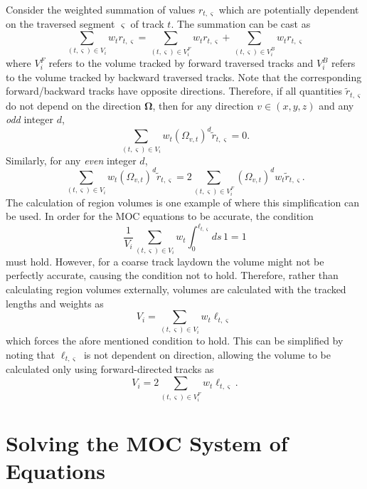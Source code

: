 Consider the weighted summation of values $r_{t,\varsigma}$ which are potentially dependent on the traversed segment $\varsigma$ of track $t$. The summation can be cast as
\begin{equation}
	\sum_{(t,\varsigma) \in V_i} w_t r_{t,\varsigma} = \sum_{(t,\varsigma) \in V^F_i} w_t r_{t,\varsigma} + \sum_{(t,\varsigma) \in V^B_i} w_t r_{t,\varsigma}
\end{equation}
where $V^F_i$ refers to the volume tracked by forward traversed tracks and $V^B_i$ refers to the volume tracked by backward traversed tracks. Note that the corresponding forward/backward tracks have opposite directions. Therefore, if all quantities $\tilde{r}_{t,\varsigma}$ do not depend on the direction $\mathbf{\Omega}$, then for any direction $v \in (x,y,z)$ and any \textit{odd} integer $d$,
\begin{equation}
\sum_{(t,\varsigma) \in V_i} w_t \left(\Omega_{v,t}\right)^d \tilde{r}_{t,\varsigma} = 0.
\end{equation}
Similarly, for any \textit{even} integer $d$,
\begin{equation}
\sum_{(t,\varsigma) \in V_i} w_t \left(\Omega_{v,t}\right)^d \tilde{r}_{t,\varsigma} = 2 \sum_{(t,\varsigma) \in V^F_i} \left(\Omega_{v,t}\right)^d w_t \tilde{r}_{t,\varsigma}.
\end{equation}
The calculation of region volumes is one example of where this simplification can be used. In order for the \ac{MOC} equations to be accurate, the condition
\begin{dmath}
	\frac{1}{V_i} \sum_{(t,\varsigma) \in V_i} w_{t} \int_{0}^{\ell_{t,\varsigma}} ds \, 1 = 1
\end{dmath}
must hold. However, for a coarse track laydown the volume might not be perfectly accurate, causing the condition not to hold. Therefore, rather than calculating region volumes externally, volumes are calculated with the tracked lengths and weights as
\begin{dmath}
	V_i = \sum_{(t,\varsigma) \in V_i} w_{t} \ell_{t,\varsigma}
\end{dmath}
which forces the afore mentioned condition to hold. This can be simplified by noting that $\ell_{t,\varsigma}$ is not dependent on direction, allowing the volume to be calculated only using forward-directed tracks as
\begin{equation}
V_i = 2 \sum_{(t,\varsigma) \in V^F_i} w_{t} \ell_{t,\varsigma}.
\end{equation}

\section{Solving the MOC System of Equations}
\label{sec:moc-solve}

